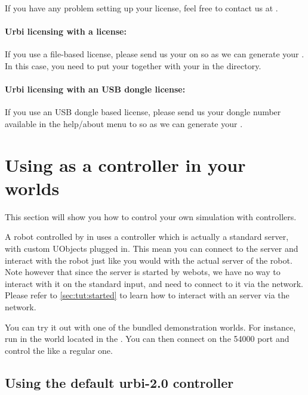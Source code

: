 If you have any problem setting up your \uwebots license, feel free to
contact us at \contactemail.

\paragraph{Urbi licensing with a \webotskey \webots license:}

If you use a file-based \webots license, please send us your
\webotskey on \contactemail so as we can generate your \urbikey. In
this case, you need to put your \webotskey together with your \urbikey
in the \webotskeydir directory.

\paragraph{Urbi licensing with an USB dongle \webots license:}

If you use an USB dongle based license, please send us your dongle
number available in the help/about \webots menu to \contactemail so as
we can generate your \urbikey.

\section{Using \urbi as a controller in your \webots worlds}

This section will show you how to control your own simulation with
\urbi controllers.

A robot controlled by \urbi in \webots uses a controller which is
actually a standard \urbi server, with custom UObjects plugged
in. This mean you can connect to the \urbi server and interact with
the robot just like you would with the actual \urbi server of the
robot. Note however that since the \urbi server is started by webots,
we have no way to interact with it on the standard input, and need to
connect to it via the network. Please refer to
\autoref{sec:tut:started} to learn how to interact with an \urbi
server via the network.

You can try it out with one of the bundled demonstration worlds. For
instance, run in \webots the  world
located in the \webotsworldsdir. You can then connect on the 54000
port and control the \aibo like a regular one.

\subsection{Using the default urbi-2.0 controller}

